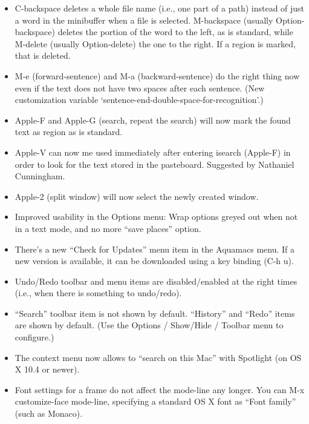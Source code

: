 \begin{itemize}
\item C-backspace deletes a whole file name (i.e., one part of a path)
  instead of just a word in the minibuffer when a file is selected.
  M-backspace (usually Option-backspace) deletes the portion of the word to the left, as is
  standard, while M-delete (usually Option-delete) the one to the right.  If a region is
  marked, that is deleted.

\item M-e (forward-sentence) and M-a (backward-sentence) do the right
  thing now even if the text does not have two spaces after each
  sentence. (New customization variable `sentence-end-double-space-for-recognition'.)

\item Apple-F and Apple-G (search, repeat the search) will now mark
  the found text as region as is standard. 

\item Apple-V can now me used immediately after entering isearch (Apple-F) in order to look for the text stored in the pasteboard.
Suggested by Nathaniel Cunningham.

\item Apple-2 (split window) will now select the newly created window. 

\item Improved usability in the Options menu: Wrap options greyed out when not in a text mode, and no more ``save places'' option.

\item There's a new ``Check for Updates'' menu item in the Aquamacs
  menu.  If a new version is available, it can be downloaded using a
  key binding (C-h u). 

\item Undo/Redo toolbar and menu items are disabled/enabled at the right times (i.e., when there is something to undo/redo).

\item ``Search'' toolbar item is not shown by default.   ``History'' and ``Redo'' items are shown by default. (Use   the Options / Show/Hide / Toolbar menu to configure.)

\item The context menu now allows to ``search on this Mac'' with Spotlight (on OS X 10.4 or newer).

\item Font settings for a frame do not affect the mode-line   any longer. You can M-x customize-face mode-line,   specifying a standard OS X font as ``Font family'' (such   as Monaco).


\end{itemize}
